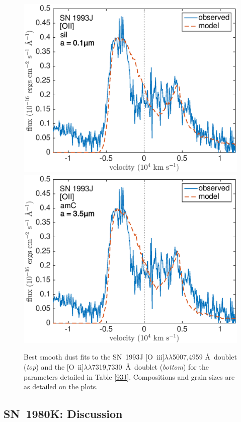 \begin{figure}[!t]
\includegraphics[scale=0.4,clip=true, trim=0 0 40 20]{chapters/chapter6/figs/93J/smooth/OII}
\includegraphics[scale=0.4,clip=true, trim=30 0 40 20]{chapters/chapter6/figs/93J/smooth/OII_amC}
\caption{Best smooth dust fits to the SN~1993J [O~{\sc iii}]$\lambda\lambda$5007,4959 \AA\ doublet ({\em top}) and the [O~{\sc ii}]$\lambda\lambda$7319,7330~\AA\ doublet ({\em bottom}) for the parameters detailed in Table \ref{93J}.  Compositions and grain sizes are as detailed on the plots.}
\label{93J_smooth}
\end{figure}



\subsection{SN~1980K: Discussion}
\label{scn:discuss}

